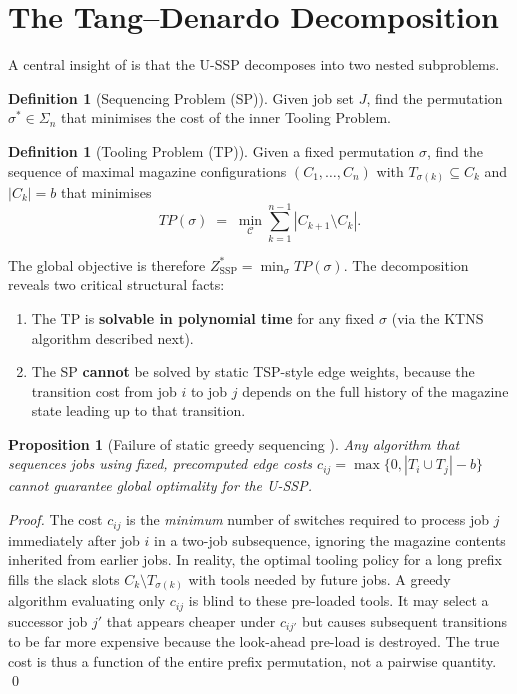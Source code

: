 \documentclass[11pt,a4paper]{article}
\theoremstyle{plain}
\newtheorem{proposition}[theorem]{Proposition}
\theoremstyle{definition}
\newtheorem{definition}[theorem]{Definition}
\begin{document}
\section{The Tang--Denardo Decomposition}
\label{sec:decomposition}

A central insight of \cite{Tang1988} is that the U-SSP decomposes into two
nested subproblems.

\begin{definition}[Sequencing Problem (SP)]
Given job set $J$, find the permutation $\sigma^* \in \Sigma_n$ that minimises
the cost of the inner Tooling Problem.
\end{definition}

\begin{definition}[Tooling Problem (TP)]
Given a fixed permutation $\sigma$, find the sequence of maximal magazine
configurations $(C_1,\ldots,C_n)$ with $T_{\sigma(k)} \subseteq C_k$ and $|C_k|=b$
that minimises
\[
  TP(\sigma) \;=\; \min_{\mathcal{C}} \sum_{k=1}^{n-1} |C_{k+1} \setminus C_k|.
\]
\end{definition}

The global objective is therefore $Z_{\mathrm{SSP}}^* = \min_{\sigma} TP(\sigma)$.
The decomposition reveals two critical structural facts:

\begin{enumerate}
\item The TP is \textbf{solvable in polynomial time} for any fixed $\sigma$
      (via the KTNS algorithm described next).
\item The SP \textbf{cannot} be solved by static TSP-style edge weights, because
      the transition cost from job $i$ to job $j$ depends on the full history of
      the magazine state leading up to that transition.
\end{enumerate}

\begin{proposition}[Failure of static greedy sequencing \cite{Tang1988}]
\label{prop:greedy_fail}
Any algorithm that sequences jobs using fixed, precomputed edge costs
$c_{ij} = \max\{0, |T_i \cup T_j| - b\}$ cannot guarantee global optimality for
the U-SSP.
\end{proposition}

\begin{proofbox}
\begin{proof}
The cost $c_{ij}$ is the \emph{minimum} number of switches required to process
job $j$ immediately after job $i$ in a two-job subsequence, ignoring the magazine
contents inherited from earlier jobs. In reality, the optimal tooling policy for a
long prefix fills the slack slots $C_k \setminus T_{\sigma(k)}$ with tools needed
by future jobs. A greedy algorithm evaluating only $c_{ij}$ is blind to these
pre-loaded tools. It may select a successor job $j'$ that appears cheaper under
$c_{ij'}$ but causes subsequent transitions to be far more expensive because the
look-ahead pre-load is destroyed. The true cost is thus a function of the entire
prefix permutation, not a pairwise quantity. \qed
\end{proof}
\end{proofbox}
\end{document}
